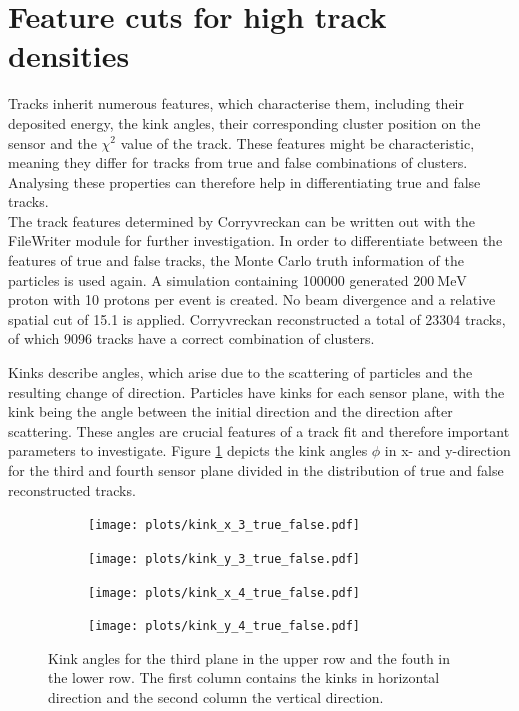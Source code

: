 \section{Feature cuts for high track densities}\label{sec:feature}
Tracks inherit numerous features, which characterise them,
including their deposited energy, the kink angles, their corresponding cluster position on the sensor and the $\chi^2$ value of the track.
These features might be characteristic, meaning they differ for tracks from true and false combinations of clusters.
Analysing these properties can therefore help in differentiating true and false tracks. \\
The track features determined by Corryvreckan can be written out with the FileWriter module for further investigation.
In order to differentiate between the features of true and false tracks, the Monte Carlo truth information of the particles is used again.
A simulation containing 100000 generated $\SI{200}{\mega\eV}$ proton with 10 protons per event is created. No beam divergence and a relative spatial cut of 15.1 is applied.
Corryvreckan reconstructed a total of 23304 tracks, of which 9096 tracks have a correct combination of clusters.

Kinks describe angles, which arise due to the scattering of particles and the resulting change of direction. Particles have kinks for each sensor plane, with the kink being
the angle between the initial direction and the direction after scattering. These angles are crucial features of a track fit and therefore important parameters to investigate.
Figure \ref{fig:kinks} depicts the kink angles $\phi$ in x- and y-direction for the third and fourth sensor plane divided in the distribution of true and false reconstructed tracks.

\begin{figure}
  \hspace{-2.5cm}
  \begin{subfigure}{0.62\textwidth}
      \texttt{[image: plots/kink\_x\_3\_true\_false.pdf]}
  \end{subfigure}
  \begin{subfigure}{0.62\textwidth}
      \hspace{0.95cm}
      \texttt{[image: plots/kink\_y\_3\_true\_false.pdf]}
  \end{subfigure}
  \begin{subfigure}{0.62\textwidth}
    \hspace{-2.5cm}
      \texttt{[image: plots/kink\_x\_4\_true\_false.pdf]}
  \end{subfigure}
  \begin{subfigure}{0.62\textwidth}
    \hspace{-2.5cm}
      \hspace{0.95cm}
      \texttt{[image: plots/kink\_y\_4\_true\_false.pdf]}
  \end{subfigure}
  \caption{Kink angles for the third plane in the upper row and the fouth in the lower row. The first column contains the kinks in horizontal direction and the second column
  the vertical direction.}
  \label{fig:kinks}
\end{figure}

